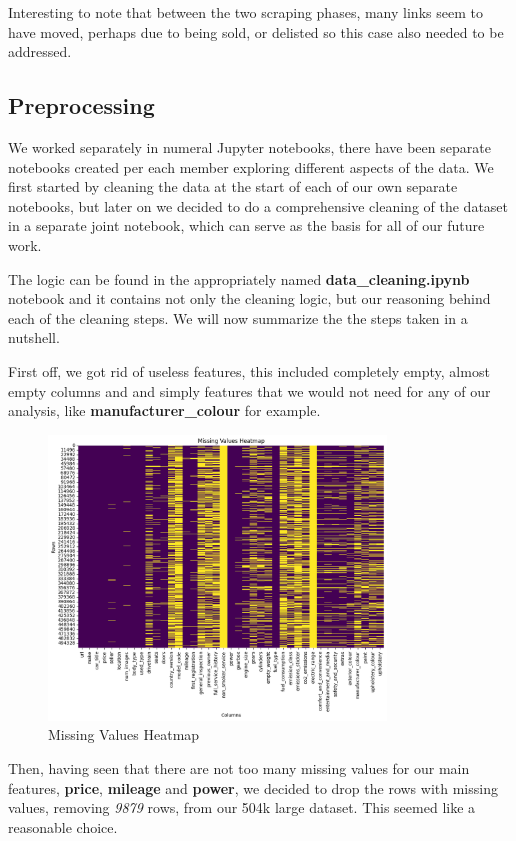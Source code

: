 \documentclass[12pt]{article}
\begin{document}
Interesting to note that between the two scraping phases, many links seem to have moved, perhaps due to being sold, or delisted so this case also needed to be addressed.

\subsection{Preprocessing}

We worked separately in numeral Jupyter notebooks, there have been separate notebooks created per each member exploring different aspects of the data. We first started by cleaning the data at the start of each of our own separate notebooks, but later on we decided to do a comprehensive cleaning of the dataset in a separate joint notebook, which can serve as the basis for all of our future work.

The logic can be found in the appropriately named \textbf{data\_cleaning.ipynb} notebook and it contains not only the cleaning logic, but our reasoning behind each of the cleaning steps. We will now summarize the the steps taken in a nutshell.

First off, we got rid of useless features, this included completely empty, almost empty columns and and simply features that we would not need for any of our analysis, like \textbf{manufacturer\_colour} for example.

\begin{figure}[ht]
  \centering
  \includegraphics[width=0.8\textwidth]{./images/missing_values_heatmap.png}
  \caption{Missing Values Heatmap}
  \label{fig:missing_values_heatmap}
\end{figure}

Then, having seen that there are not too many missing values for our main features, \textbf{price}, \textbf{mileage} and \textbf{power}, we decided to drop the rows with missing values, removing \textit{9879} rows, from our 504k large dataset. This seemed like a reasonable choice.
\end{document}
